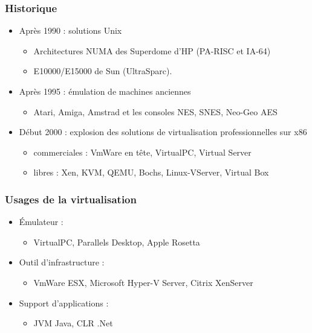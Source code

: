 \begin{frame}
\frametitle{Historique}
\begin{itemize}
\item <1>Après 1990 : solutions Unix
\begin{itemize}
\item Architectures NUMA des Superdome d'HP (PA-RISC et IA-64)
\item E10000/E15000 de Sun (UltraSparc).
\end{itemize}

\item <2>Après 1995 : émulation de machines anciennes
\begin{itemize}
\item Atari, Amiga, Amstrad et les consoles NES, SNES, Neo-Geo AES
\end{itemize}

\item <3>Début 2000 : explosion des solutions de virtualisation professionnelles sur x86
\begin{itemize}
\item commerciales : VmWare en tête, VirtualPC, Virtual Server
\item libres : Xen, KVM, QEMU, Bochs, Linux-VServer, Virtual Box
\end{itemize}
\end{itemize}

\end{frame}


\begin{frame}
\frametitle{Usages de la virtualisation}
\begin{itemize}

\item <1>Émulateur :
\begin{itemize}
\item VirtualPC, Parallels Desktop, Apple Rosetta
\end{itemize}

\item <2>Outil d'infrastructure :
\begin{itemize}
\item VmWare ESX, Microsoft Hyper-V Server, Citrix XenServer
\end{itemize}

\item <3>Support d'applications :
\begin{itemize}
\item JVM Java, CLR .Net
\end{itemize}

\end{itemize}
\end{frame}


